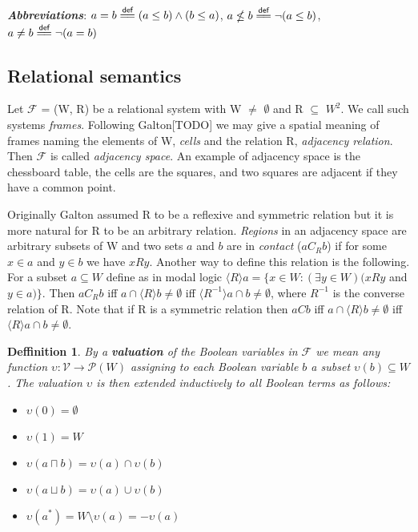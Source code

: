 \documentclass{article}
\newcommand\eqdef{\mathrel{\overset{\makebox[0pt]{\mbox{\normalfont\scriptsize\sffamily def}}}{=\joinrel=}}}
\newcommand\F{\mathcal{F}}
\newcommand\p{\mathcal{P}}
\newcommand\V{\mathcal{V}}
\newtheorem{defn}[theorem]{Deffinition}
\begin{document}
	\noindent\textbf{\textit{Abbreviations}}:
		$a = b \eqdef (a \leq b) \land (b \leq a)$,
		$a \nleq b \eqdef \neg(a \leq b)$,
		$a \neq b \eqdef \neg(a = b)$

	\subsection{Relational semantics}
	\label{relational-system}

	\par
	Let $\F$ = (W, R) be a relational system with W $\neq$ $\emptyset$ and R $\subseteq$ $W^2$. We call such systems \textit{frames}. Following Galton[TODO] we may give a spatial meaning of frames naming the elements of W, \textit{cells} and the relation R, \textit{adjacency relation}. Then $\F$ is called \textit{adjacency space}. An example of adjacency space is the chessboard table, the cells are the squares, and two squares are adjacent if they have a common point.

	\par
	Originally Galton assumed R to be a reflexive and symmetric relation but it is more natural for R to be an arbitrary relation. \textit{Regions} in an adjacency space are arbitrary subsets of W and two sets $a$ and $b$ are in \textit{contact} ($aC_Rb$) if for some $x \in a$ and $y \in b$ we have $xRy$. Another way to define this relation is the following. For a subset $a \subseteq W$ define as in modal logic $\langle R \rangle a = \{ x \in W : (\exists y \in W)(xRy$ and $y \in a)\}$. Then $aC_Rb$ iff $a \cap \langle R \rangle b \neq \emptyset$ iff $\langle R^{-1} \rangle a \cap b \neq \emptyset$, where $R^{-1}$ is the converse relation of R. Note that if R is a symmetric relation then $aCb$ iff $a \cap \langle R \rangle b \neq \emptyset$ iff $\langle R \rangle a \cap b \neq \emptyset$.

	\begin{defn}
		\label{valuation}
		By a \textbf{\textit{valuation}} of the Boolean variables in $\F$ we mean any function $\upsilon : \V \rightarrow \p(W)$ assigning to each Boolean variable $b$ a subset $\upsilon(b) \subseteq W$. The valuation $\upsilon$ is then extended inductively to all Boolean terms as follows:

		\begin{itemize}
			\item $\upsilon(0) = \emptyset$
			\item $\upsilon(1) = W$
			\item $\upsilon(a \sqcap b) = \upsilon(a) \cap \upsilon(b)$
			\item $\upsilon(a \sqcup b) = \upsilon(a) \cup \upsilon(b)$
			\item $\upsilon(a^*) = W \setminus \upsilon(a) = -\upsilon(a)$
		\end{itemize}
	\end{defn}
\end{document}

